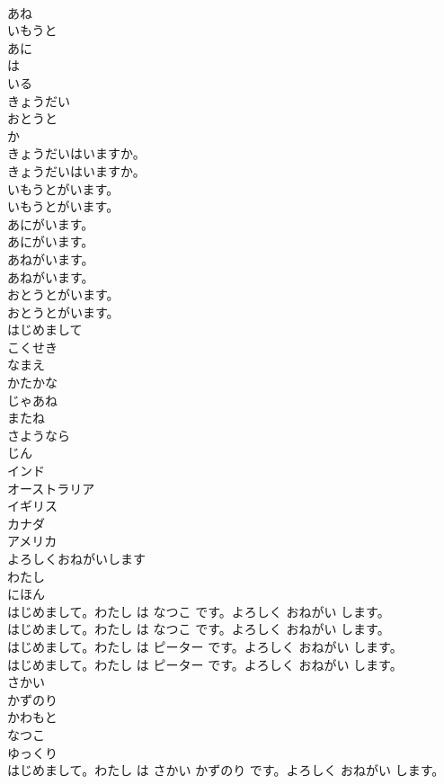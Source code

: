 \documentclass[8pt]{extreport}
\begin{document}
\begin{CJK}{UTF8}{min}
\\	あね
\\	いもうと
\\	あに
\\	は
\\	いる
\\	きょうだい
\\	おとうと
\\	か
\\	きょうだいはいますか。	
\\	きょうだいはいますか。 
\\	いもうとがいます。	
\\	いもうとがいます。 
\\	あにがいます。	
\\	あにがいます。 
\\	あねがいます。	
\\	あねがいます。 
\\	おとうとがいます。	
\\	おとうとがいます。 
\\	はじめまして
\\	こくせき
\\	なまえ
\\	かたかな
\\	じゃあね
\\	またね
\\	さようなら
\\	じん
\\	インド
\\	オーストラリア
\\	イギリス
\\	カナダ
\\	アメリカ
\\	よろしくおねがいします
\\	わたし
\\	にほん
\\	はじめまして。わたし は なつこ です。よろしく おねがい します。	
\\	はじめまして。わたし は なつこ です。よろしく おねがい します。 
\\	はじめまして。わたし は ピーター です。よろしく おねがい します。	
\\	はじめまして。わたし は ピーター です。よろしく おねがい します。 
\\	さかい
\\	かずのり
\\	かわもと
\\	なつこ
\\	ゆっくり
\\	はじめまして。わたし は さかい かずのり です。よろしく おねがい します。	

\end{CJK}
\end{document}
